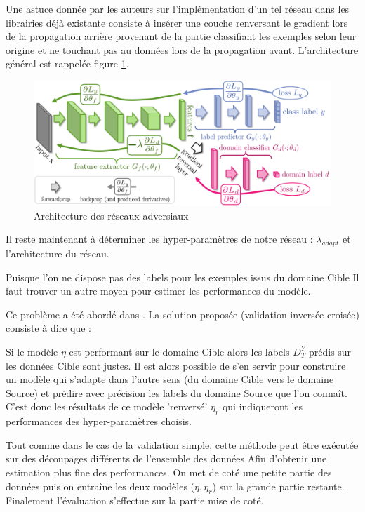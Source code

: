 \documentclass[accepted]{article} %
\begin{document}
Une astuce donnée par les auteurs sur l'implémentation d'un tel réseau dans 
les librairies déjà existante consiste à insérer une couche renversant le 
gradient lors de la propagation arrière provenant de la partie classifiant
les exemples selon leur origine et ne touchant pas au données lors 
de la propagation avant. L'architecture général est rappelée figure 
\ref{fig:arch}.

\begin{figure}
\centering
\includegraphics[width=\textwidth]{fig/arch.png}
\caption{Architecture des réseaux adversiaux}
\label{fig:arch}
\end{figure}

Il reste maintenant à déterminer les hyper-paramètres de notre réseau : 
$\lambda_{adapt}$ et l'architecture du réseau.

Puisque l'on ne dispose pas des labels pour les exemples issus du domaine Cible
Il faut trouver un autre moyen pour estimer les performances du modèle.

Ce problème a été abordé dans \cite{Zhong}. La solution proposée (validation 
inversée croisée) consiste à dire que :

Si le modèle $\eta$ est performant sur le domaine Cible alors les labels $D_T^Y$ 
prédis sur les données Cible sont justes. Il est alors possible de s'en servir
pour construire un modèle qui s'adapte dans l'autre sens (du domaine Cible 
vers le domaine Source) et prédire avec précision les labels du domaine Source
que l'on connaît. C'est donc les résultats de ce modèle 'renversé' $\eta_r$ qui 
indiqueront les performances des hyper-paramètres choisis. 

Tout comme dans le cas de la validation simple, cette méthode peut être 
exécutée sur des découpages différents de l'ensemble des données Afin 
d'obtenir une estimation plus fine des performances. 
On met de coté une petite partie des données puis on entraîne les deux modèles
($\eta,\eta_r$) sur la grande partie restante. Finalement l'évaluation 
s'effectue sur la partie mise de coté.
\end{document}
